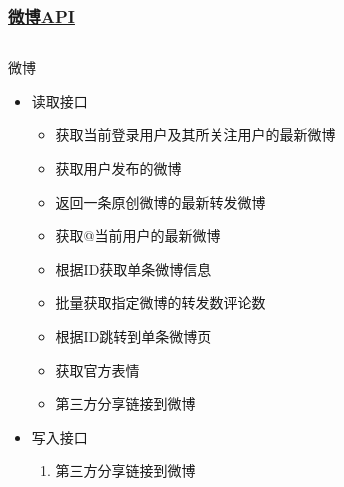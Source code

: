 \documentclass[../Postbot.tex]{subfiles}
\begin{document}
	\begin{frame}
		\frametitle{\href{https://open.weibo.com/wiki/\%E5\%BE\%AE\%E5\%8D\%9AAPI}{微博API}}
		\begin{columns}
			\begin{column}{.9\textwidth}
				微博 \\ 
				\begin{itemize}
					\item {
						读取接口 \\
						\begin{itemize}
							\item 获取当前登录用户及其所关注用户的最新微博
							\item 获取用户发布的微博
							\item 返回一条原创微博的最新转发微博
							\item 获取@当前用户的最新微博
							\item 根据ID获取单条微博信息
							\item 批量获取指定微博的转发数评论数
							\item 根据ID跳转到单条微博页
							\item 获取官方表情
							\item 第三方分享链接到微博
						\end{itemize}
						}
					\item {
						写入接口 \\
						\begin{enumerate}
							\item 第三方分享链接到微博
						\end{enumerate}
						}
				\end{itemize}
			\end{column}		
		\end{columns}
	\end{frame}
\end{document}
